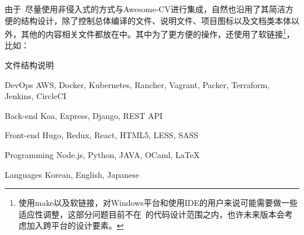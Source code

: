 \begin{cvparagraph}
由于\dk~尽量使用非侵入式的方式与Awesome-CV进行集成，自然也沿用了其简洁方便的结构设计，除了控制总体编译的文件、说明文件、项目图标以及文档类本体以外，其他的内容相关文件都放在中。其中为了更方便的操作，还使用了软链接\footnote{使用make以及软链接，对Windows平台和使用IDE的用户来说可能需要做一些适应性调整，这部分问题目前不在\dk~的代码设计范围之内，也许未来版本会考虑加入跨平台的设计要素。}，比如：


\end{cvparagraph}

\begin{dkcomment}{文件结构说明}{\faFolder}
\end{dkcomment}

\begin{cvskills}

  \cvskill
    {DevOps} %
    {AWS, Docker, Kubernetes, Rancher, Vagrant, Packer, Terraform, Jenkins, CircleCI} %

  \cvskill
    {Back-end} %
    {Koa, Express, Django, REST API} %

  \cvskill
    {Front-end} %
    {Hugo, Redux, React, HTML5, LESS, SASS} %

  \cvskill
    {Programming} %
    {Node.js, Python, JAVA, OCaml, LaTeX} %

  \cvskill
    {Languages} %
    {Korean, English, Japanese} %

\end{cvskills}

\clearpage
